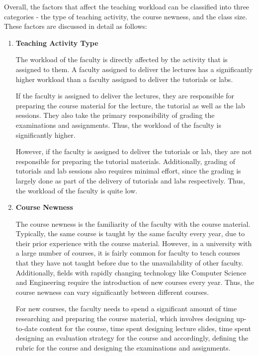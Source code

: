 Overall, the factors that affect the teaching workload can be classified into three categories - the type of teaching activity, the course newness, and the class size. These factors are discussed in detail as follows:

\begin{enumerate}

  \item \textbf{Teaching Activity Type}
        \label{sec:activity_type}

        The workload of the faculty is directly affected by the activity that is assigned to them. A faculty assigned to deliver the lectures has a significantly higher workload than a faculty assigned to deliver the tutorials or labs.

        If the faculty is assigned to deliver the lectures, they are responsible for preparing the course material for the lecture, the tutorial as well as the lab sessions. They also take the primary responsibility of grading the examinations and assignments. Thus, the workload of the faculty is significantly higher.

        However, if the faculty is assigned to deliver the tutorials or lab, they are not responsible for preparing the tutorial materials. Additionally, grading of tutorials and lab sessions also requires minimal effort, since the grading is largely done as part of the delivery of tutorials and labs respectively. Thus, the workload of the faculty is quite low.

  \item \textbf{Course Newness}

        The course newness is the familiarity of the faculty with the course material. Typically, the same course is taught by the same faculty every year, due to their prior experience with the course material. However, in a university with a large number of courses, it is fairly common for faculty to teach courses that they have not taught before due to the unavailability of other faculty. Additionally, fields with rapidly changing technology like Computer Science and Engineering require the introduction of new courses every year. Thus, the course newness can vary significantly between different courses.

        For new courses, the faculty needs to spend a significant amount of time researching and preparing the course material, which involves designing up-to-date content for the course, time spent designing lecture slides, time spent designing an evaluation strategy for the course and accordingly, defining the rubric for the course and designing the examinations and assignments.


\end{enumerate}
